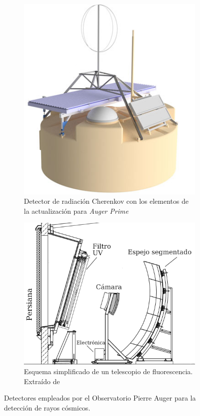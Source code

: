 \begin{figure}[H]
    \begin{subfigure}[t]{0.45\textwidth}
	\includegraphics[width=\textwidth]{tanque.png}
	\caption{Detector de radiación Cherenkov con los elementos de la actualización para \emph{Auger Prime}} 	\label{fig:tanque}
    \end{subfigure}%
    \hspace{\fill}
    \begin{subfigure}[t]{0.5\textwidth}
	\includegraphics[width=\textwidth]{fd.png}
	\caption{Esquema simplificado de un telescopio de fluorescencia. Extraído de \cite{kit_oracle}}
	\label{fig:FD}
    \end{subfigure}%
    \caption{Detectores empleados por el Observatorio Pierre Auger para la detección de rayos cósmicos.}
\end{figure}
